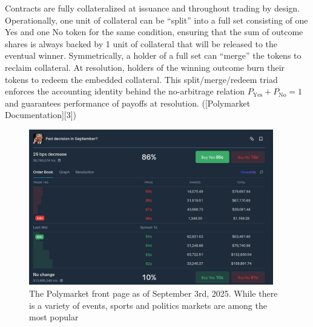 Contracts are fully collateralized at issuance and throughout trading by design. Operationally, one unit of collateral can be “split” into a full set consisting of one Yes and one No token for the same condition, ensuring that the sum of outcome shares is always backed by 1 unit of collateral that will be released to the eventual winner. Symmetrically, a holder of a full set can “merge” the tokens to reclaim collateral. At resolution, holders of the winning outcome burn their tokens to redeem the embedded collateral. This split/merge/redeem triad enforces the accounting identity behind the no-arbitrage relation $P_{\text{Yes}} + P_{\text{No}} = 1$ and guarantees performance of payoffs at resolution. ([Polymarket Documentation][3])


\begin{figure}[H]
  \begin{center}
    \includegraphics[width=0.95\textwidth]{figures/polymarket_continuous_double_auction.png}
  \end{center}
  \caption{The Polymarket front page as of September 3rd, 2025. While there is a variety of events, sports and politics markets are among the most popular}
\end{figure}


